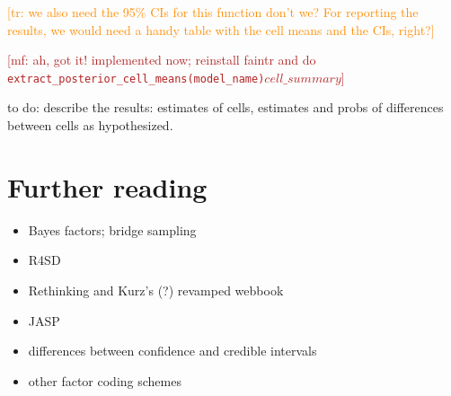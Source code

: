 \documentclass[nobib]{tufte-handout}
\renewcommand{\mf}[1]{\textcolor{firebrick}{[mf: #1]}}
\newcommand{\tr}[1]{\textcolor{DarkOrange}{[tr: #1]}}
\begin{document}
\tr{we also need the 95\% CIs for this function don't we? For reporting the results, we would need a handy table with the cell means and the CIs, right?}

\mf{ah, got it! implemented now; reinstall faintr and do \texttt{extract_posterior_cell_means(model_name)$cell\_summary$}}

to do: describe the results: estimates of cells, estimates and probs of differences between cells as hypothesized.

\section{Further reading}

\begin{itemize}
\item Bayes factors; bridge sampling
\item R4SD
\item Rethinking and Kurz's (?) revamped webbook
\item JASP
\item differences between confidence and credible intervals
\item other factor coding schemes 
\end{itemize}




\printbibliography[heading=bibintoc]
\end{document}
